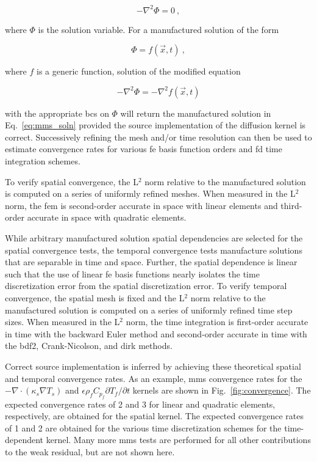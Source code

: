 \begin{equation}
\label{eq:diff_example}
-\nabla^2\Phi=0\ ,
\end{equation}
 
\noindent where \(\Phi\) is the solution variable. For a manufactured solution of the form

\begin{equation}
\label{eq:mms_soln}
\Phi=f(\vec{x},t)\ ,
\end{equation}

\noindent where \(f\) is a generic function, solution of the modified equation

\begin{equation}
-\nabla^2\Phi=-\nabla^2f(\vec{x},t)
\end{equation}

\noindent with the appropriate \glspl{bc} on \(\Phi\) will return the manufactured solution in Eq.\ \eqref{eq:mms_soln} provided the source implementation of the diffusion kernel is correct. Successively refining the mesh and/or time resolution can then be used to estimate convergence rates for various \gls{fe} basis function orders and \gls{fd} time integration schemes.

To verify spatial convergence, the L$^2$ norm relative to the manufactured solution is computed on a series of uniformly refined meshes. When measured in the L$^2$ norm, the \gls{fem} is second-order accurate in space with linear elements and third-order accurate in space with quadratic elements. 

While arbitrary manufactured solution spatial dependencies are selected for the spatial convergence tests, the temporal convergence tests manufacture solutions that are separable in time and space. Further, the spatial dependence is linear such that the use of linear \gls{fe} basis functions nearly isolates the time discretization error from the spatial discretization error. To verify temporal convergence, the spatial mesh is fixed and the L$^2$ norm relative to the manufactured solution is computed on a series of uniformly refined time step sizes. When measured in the L$^2$ norm, the time integration is first-order accurate in time with the backward Euler method and second-order accurate in time with the \gls{bdf2}, Crank-Nicolson, and \gls{dirk} methods. 

Correct source implementation is inferred by achieving these theoretical spatial and temporal convergence rates. As an example, \gls{mms} convergence rates for the \(-\nabla\cdot(\kappa_s\nabla T_s)\) and \(\epsilon\rho_fC_{p_f}\partial T_f/\partial t\) kernels are shown in Fig.\ \ref{fig:convergence}. The expected convergence rates of 2 and 3 for linear and quadratic elements, respectively, are obtained for the spatial kernel. The expected convergence rates of 1 and 2 are obtained for the various time discretization schemes for the time-dependent kernel. Many more \gls{mms} tests are performed for all other contributions to the weak residual, but are not shown here.

